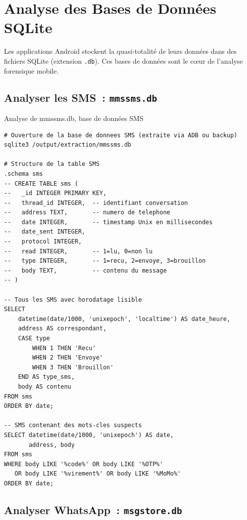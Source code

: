 \section{Analyse des Bases de Données SQLite}
\label{sec:sqlite}

Les applications Android stockent la quasi-totalité de leurs données
dans des fichiers SQLite (extension \texttt{.db}). Ces bases de données
sont le c\oe ur de l'analyse forensique mobile.

\subsection{Analyser les SMS~: \texttt{mmssms.db}}

\begin{boxoutils}{Analyse de mmssms.db, base de données SMS}
\begin{lstlisting}[language=bash_forensique]
# Ouverture de la base de donnees SMS (extraite via ADB ou backup)
sqlite3 /output/extraction/mmssms.db

# Structure de la table SMS
.schema sms
-- CREATE TABLE sms (
--   _id INTEGER PRIMARY KEY,
--   thread_id INTEGER,  -- identifiant conversation
--   address TEXT,       -- numero de telephone
--   date INTEGER,       -- timestamp Unix en millisecondes
--   date_sent INTEGER,
--   protocol INTEGER,
--   read INTEGER,       -- 1=lu, 0=non lu
--   type INTEGER,       -- 1=recu, 2=envoye, 3=brouillon
--   body TEXT,          -- contenu du message
-- )

-- Tous les SMS avec horodatage lisible
SELECT
    datetime(date/1000, 'unixepoch', 'localtime') AS date_heure,
    address AS correspondant,
    CASE type
        WHEN 1 THEN 'Recu'
        WHEN 2 THEN 'Envoye'
        WHEN 3 THEN 'Brouillon'
    END AS type_sms,
    body AS contenu
FROM sms
ORDER BY date;

-- SMS contenant des mots-cles suspects
SELECT datetime(date/1000, 'unixepoch') AS date,
       address, body
FROM sms
WHERE body LIKE '%code%' OR body LIKE '%OTP%'
   OR body LIKE '%virement%' OR body LIKE '%MoMo%'
ORDER BY date;
\end{lstlisting}
\end{boxoutils}

\subsection{Analyser WhatsApp~: \texttt{msgstore.db}}

